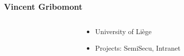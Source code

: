 \begin{frame}
\frametitle{Vincent Gribomont}
\begin{columns}
\begin{column}{0.4\linewidth}
\end{column}
\begin{column}{0.6\linewidth}
\begin{itemize}
\item University of Liège
\item Projects: SemiSecu, Intranet
\end{itemize}
\end{column}
\end{columns}
\end{frame}


